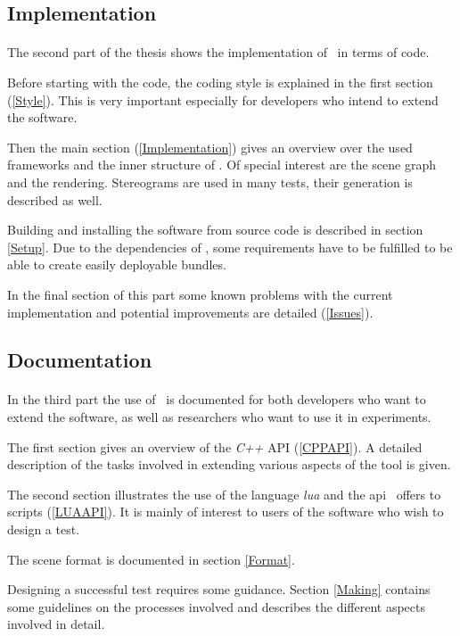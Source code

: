 \subsection{Implementation}
\paragraph{}
The second part of the thesis shows the implementation of \ER\ in terms of code.

Before starting with the code, the coding style is explained in the first section (\ref{Style}).
This is very important especially for developers who intend to extend the software.

Then the main section (\ref{Implementation}) gives an overview over the used frameworks and the inner structure of \ER.
Of special interest are the scene graph and the rendering.
Stereograms are used in many tests, their generation is described as well.

Building and installing the software from source code is described in section \ref{Setup}.
Due to the dependencies of \ER, some requirements have to be fulfilled to be able to create easily deployable bundles.

In the final section of this part some known problems with the current implementation and potential improvements are detailed (\ref{Issues}).


\subsection{Documentation}
\paragraph{}
In the third part the use of \ER\ is documented for both developers who want to extend the software, as well as researchers who want to use it in experiments.

The first section gives an overview of the \textit{C++} API (\ref{CPPAPI}).
A detailed description of the tasks involved in extending various aspects of the tool is given.

The second section illustrates the use of the language \textit{lua} and the api \ER\ offers to scripts (\ref{LUAAPI}).
It is mainly of interest to users of the software who wish to design a test.

The scene format is documented in section \ref{Format}.

Designing a successful test requires some guidance.
Section \ref{Making} contains some guidelines on the processes involved and describes the different aspects involved in detail.

